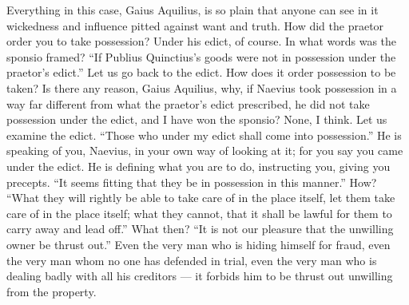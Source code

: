  Everything in this case, Gaius Aquilius, is so plain that anyone can see in it wickedness and influence pitted against want and truth. How did the praetor order you to take possession? Under his edict, of course. In what words was the sponsio framed? ``If Publius Quinctius's goods were not in possession under the praetor's edict.'' Let us go back to the edict. How does it order possession to be taken? Is there any reason, Gaius Aquilius, why, if Naevius took possession in a way far different from what the praetor's edict prescribed, he did not take possession under the edict, and I have won the sponsio? None, I think. Let us examine the edict. ``Those who under my edict shall come into possession.'' He is speaking of you, Naevius, in your own way of looking at it; for you say you came under the edict. He is defining what you are to do, instructing you, giving you precepts. ``It seems fitting that they be in possession in this manner.'' How? ``What they will rightly be able to take care of in the place itself, let them take care of in the place itself; what they cannot, that it shall be lawful for them to carry away and lead off.'' What then? ``It is not our pleasure that the unwilling owner be thrust out.'' Even the very man who is hiding himself for fraud, even the very man whom no one has defended in trial, even the very man who is dealing badly with all his creditors --- it forbids him to be thrust out unwilling from the property.

